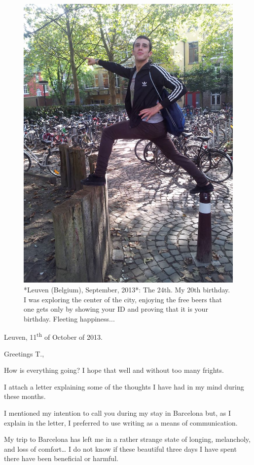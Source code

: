\documentclass[]{book}
\begin{document}
\begin{figure}

{\centering \includegraphics[width=0.75\linewidth]{images/2014/explorer} 

}

\caption{*Leuven (Belgium), September, 2013*: The 24th. My 20th birthday. I was exploring the center of the city, enjoying the free beers that one gets only by showing your ID and proving that it is your birthday. Fleeting happiness...}\label{fig:explorer}
\end{figure}

Leuven, 11\textsuperscript{th} of October of 2013.

Greetings T.,

How is everything going? I hope that well and without too many frights.

I attach a letter explaining some of the thoughts I have had in my mind during these months.

I mentioned my intention to call you during my stay in Barcelona but, as I explain in the letter, I preferred to use writing as a means of communication.

My trip to Barcelona has left me in a rather strange state of longing, melancholy, and loss of comfort\ldots{} I do not know if these beautiful three days I have spent there have been beneficial or harmful.
\end{document}
